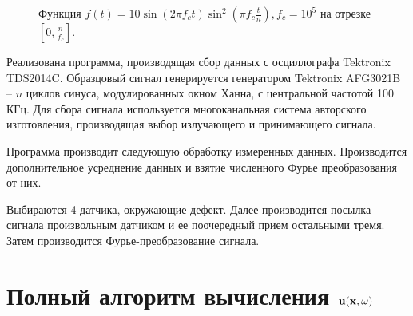 \documentclass[a4paper, 12pt]{article}
\begin{document}
    \begin{figure}[h]
        \caption{Функция $f(t)=10 \sin (2\pi f_c t) \sin^2 (\pi f_c \frac{t}{n}), f_c = 10^5$ на отрезке $[0, \frac{n}{f_c}]$.}
        \label{window}
    \end{figure}
Реализована программа, производящая сбор данных с осциллографа Tektronix TDS2014C.
Образцовый сигнал  генерируется генератором Tektronix AFG3021B – $n$ циклов синуса, модулированных окном Ханна, с центральной частотой 100 КГц.
Для сбора сигнала  используется многоканальная система авторского изготовления,  производящая выбор излучающего и принимающего сигнала. 
    
Программа производит следующую обработку измеренных данных. Производится   дополнительное усреднение данных и взятие численного Фурье преобразования от них.

Выбираются 4 датчика, окружающие дефект.
Далее производится посылка сигнала произвольным датчиком и ее поочередный прием остальными тремя. Затем производится Фурье-преобразование сигнала.
 
\section{Полный алгоритм вычисления ${\bf u}({\bf x},\omega)$}
\end{document}

